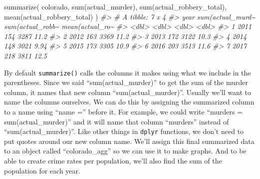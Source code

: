 \documentclass[
]{krantz}
\makeatletter
\newenvironment{Shaded}{\begin{snugshade}}{\end{snugshade}}
\newcommand{\CommentTok}[1]{\textcolor[rgb]{0.37,0.37,0.37}{\textit{#1}}}
\newcommand{\FunctionTok}[1]{\textcolor[rgb]{0,0,0}{#1}}
\newcommand{\NormalTok}[1]{#1}
\newenvironment{kframe}{%
\medskip{}
\setlength{\fboxsep}{.8em}
 \def\at@end@of@kframe{}%
 \ifinner\ifhmode%
  \def\at@end@of@kframe{\end{minipage}}%
  \begin{minipage}{\columnwidth}%
 \fi\fi%
 \def\FrameCommand##1{\hskip\@totalleftmargin \hskip-\fboxsep
 \colorbox{shadecolor}{##1}\hskip-\fboxsep
     \hskip-\linewidth \hskip-\@totalleftmargin \hskip\columnwidth}%
 \MakeFramed {\advance\hsize-\width
   \@totalleftmargin\z@ \linewidth\hsize
   \@setminipage}}%
 {\par\unskip\endMakeFramed%
 \at@end@of@kframe}
\renewenvironment{Shaded}{\begin{kframe}}{\end{kframe}}
\makeatother
\begin{document}
\begin{Shaded}
\begin{Highlighting}[]
\FunctionTok{summarize}\NormalTok{(}
\NormalTok{  colorado, }\FunctionTok{sum}\NormalTok{(actual\_murder),}
  \FunctionTok{sum}\NormalTok{(actual\_robbery\_total),}
  \FunctionTok{mean}\NormalTok{(actual\_robbery\_total)}
\NormalTok{)}
\CommentTok{\#\textgreater{} \# A tibble: 7 x 4}
\CommentTok{\#\textgreater{}    year \textasciigrave{}sum(actual\_murd\textasciitilde{} \textasciigrave{}sum(actual\_robb\textasciitilde{} \textasciigrave{}mean(actual\_ro\textasciitilde{}}
\CommentTok{\#\textgreater{}   \textless{}dbl\textgreater{}             \textless{}dbl\textgreater{}             \textless{}dbl\textgreater{}            \textless{}dbl\textgreater{}}
\CommentTok{\#\textgreater{} 1  2011               154              3287            11.2 }
\CommentTok{\#\textgreater{} 2  2012               163              3369            11.2 }
\CommentTok{\#\textgreater{} 3  2013               172              3122            10.3 }
\CommentTok{\#\textgreater{} 4  2014               148              3021             9.94}
\CommentTok{\#\textgreater{} 5  2015               173              3305            10.9 }
\CommentTok{\#\textgreater{} 6  2016               203              3513            11.6 }
\CommentTok{\#\textgreater{} 7  2017               218              3811            12.5}
\end{Highlighting}
\end{Shaded}

By default \texttt{summarize()} calls the columns it makes
using what we include in the parentheses. Since we said
``sum(actual\_murder)'' to get the sum of the murder column,
it names that new column ``sum(actual\_murder)''. Usually
we'll want to name the columns ourselves. We can do this by
assigning the summarized column to a name using ``name =''
before it. For example, we could write ``murders =
sum(actual\_murder)'' and it will name that column
``murders'' instead of ``sum(actual\_murder)''. Like other
things in \texttt{dplyr} functions, we don't need to put
quotes around our new column name. We'll assign this final
summarized data to an object called ``colorado\_agg'' so we
can use it to make graphs. And to be able to create crime
rates per population, we'll also find the sum of the
population for each year.
\end{document}
